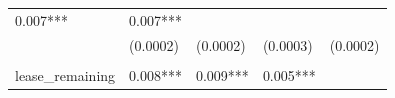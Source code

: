 \documentclass[]{book}
\begin{document}
\begin{longtable}[]{@{}lllll@{}}
\begin{minipage}[t]{0.18\columnwidth}
0.007***\strut
\end{minipage} & \begin{minipage}[t]{0.18\columnwidth}\raggedright\strut
0.007***\strut
\end{minipage}\tabularnewline
\begin{minipage}[t]{0.15\columnwidth}\raggedright\strut
\strut
\end{minipage} & \begin{minipage}[t]{0.17\columnwidth}\raggedright\strut
(0.0002)\strut
\end{minipage} & \begin{minipage}[t]{0.17\columnwidth}\raggedright\strut
(0.0002)\strut
\end{minipage} & \begin{minipage}[t]{0.18\columnwidth}\raggedright\strut
(0.0003)\strut
\end{minipage} & \begin{minipage}[t]{0.18\columnwidth}\raggedright\strut
(0.0002)\strut
\end{minipage}\tabularnewline
\begin{minipage}[t]{0.15\columnwidth}\raggedright\strut
\strut
\end{minipage} & \begin{minipage}[t]{0.17\columnwidth}\raggedright\strut
\strut
\end{minipage} & \begin{minipage}[t]{0.17\columnwidth}\raggedright\strut
\strut
\end{minipage} & \begin{minipage}[t]{0.18\columnwidth}\raggedright\strut
\strut
\end{minipage} & \begin{minipage}[t]{0.18\columnwidth}\raggedright\strut
\strut
\end{minipage}\tabularnewline
\begin{minipage}[t]{0.15\columnwidth}\raggedright\strut
lease\_remaining\strut
\end{minipage} & \begin{minipage}[t]{0.17\columnwidth}\raggedright\strut
0.008***\strut
\end{minipage} & \begin{minipage}[t]{0.17\columnwidth}\raggedright\strut
0.009***\strut
\end{minipage} & \begin{minipage}[t]{0.18\columnwidth}\raggedright\strut
0.005***\strut
\end{minipage} & \begin{minipage}[t]{0.18\columnwidth}\raggedright\strut

\end{minipage}
\end{longtable}
\end{document}
